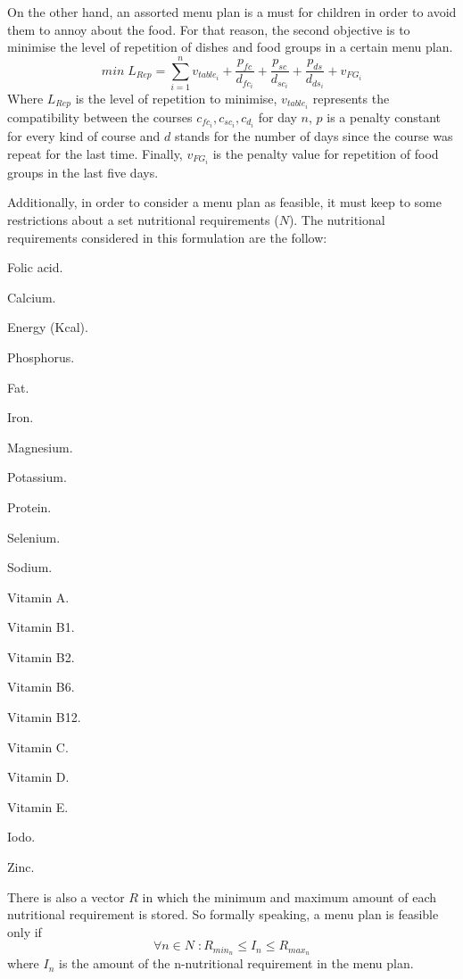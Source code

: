On the other hand, an assorted menu plan is a must for children in order to avoid them to annoy about the food. For that reason, the second objective is to minimise the level of repetition of dishes and food groups in a certain menu plan. 
\[
    min\; L_{Rep} = \sum_{i=1}^{n}{v_{table_{i}} + \frac{p_{fc}}{d_{fc_{i}}} + \frac{p_{sc}}{d_{sc_{i}}} + \frac{p_{ds}}{d_{ds_{i}}} + v_{FG_{i}}}
\]
Where $L_{Rep}$ is the level of repetition to minimise, $v_{table_{i}}$ represents the compatibility between the courses $c_{fc_{i}}, c_{sc_{i}}, c_{d_{i}}$ for day $n$, $p$ is a penalty constant for every kind of course and $d$ stands for the number of days since the course was repeat for the last time. Finally, $v_{FG_{i}}$ is the penalty value for repetition of food groups in the last five days.

Additionally, in order to consider a menu plan as feasible, it must keep to some restrictions about a set nutritional requirements ($N$). The nutritional requirements considered in this formulation are the follow:
\begin{AutoMultiColItemize}
    \item Folic acid.
    \item Calcium.
    \item Energy (Kcal).
    \item Phosphorus.
    \item Fat.
    \item Iron.
    \item Magnesium.
    \item Potassium.
    \item Protein.
    \item Selenium.
    \item Sodium.
    \item Vitamin A.
    \item Vitamin B1.
    \item Vitamin B2.
    \item Vitamin B6.
    \item Vitamin B12.
    \item Vitamin C.
    \item Vitamin D.
    \item Vitamin E.
    \item Iodo.
    \item Zinc.
\end{AutoMultiColItemize}
There is also a vector $R$ in which the minimum and maximum amount of each nutritional requirement is stored. So formally speaking, a menu plan is feasible only if
\[
    \forall	 n \in N\; : R_{min_{n}} \leq I_{n} \leq R_{max_{n}}
\]
where $I_{n}$ is the amount of the n-nutritional requirement in the menu plan.

